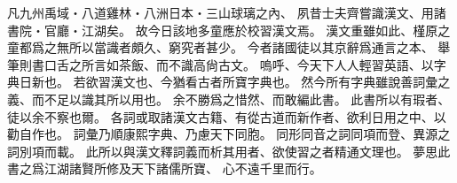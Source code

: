 凡九州禹域・八道雞林・八洲日本・三山球璃之內、
夙昔士夫齊嘗識漢文、用諸書院・官廳・江湖矣。
故今日該地多童應於校習漢文焉。
漢文重雖如此、槿原之童都爲之無所以當識者頗久、窮究者甚少。
今者諸國徒以其京辭爲通言之本、
舉筆則書口舌之所言如茶飯、而不識高尙古文。
嗚呼、今天下人人輕習英語、以字典日新也。
若欲習漢文也、今猶看古者所寶字典也。
然今所有字典雖說善詞彙之義、而不足以識其所以用也。
余不勝爲之惜然、而敢編此書。
此書所以有瑕者、徒以余不察也爾。
各詞或取諸漢文古籍、有從古道而新作者、欲利日用之中、以勸自作也。
詞彙乃順康熙字典、乃慮天下同胞。
同形同音之詞同項而登、異源之詞別項而載。
此所以與漢文釋詞義而析其用者、欲使習之者精通文理也。
夢思此書之爲江湖諸賢所修及天下諸儒所寶、
心不遠千里而行。
